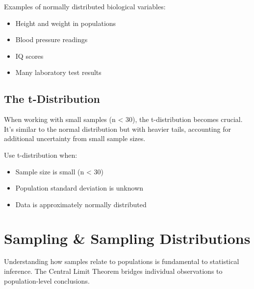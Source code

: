 \documentclass[
  11pt,
  letterpaper,
  oneside]{book}
\providecommand{\tightlist}{%
  \setlength{\itemsep}{0pt}\setlength{\parskip}{0pt}}\usepackage{longtable,booktabs,array}
\begin{document}
Examples of normally distributed biological variables:

\begin{itemize}
\tightlist
\item
  Height and weight in populations
\item
  Blood pressure readings
\item
  IQ scores
\item
  Many laboratory test results
\end{itemize}

\subsection{The t-Distribution}\label{the-t-distribution}

When working with small samples (n \textless{} 30), the t-distribution
becomes crucial. It's similar to the normal distribution but with
heavier tails, accounting for additional uncertainty from small sample
sizes.

\begin{tcolorbox}[enhanced jigsaw, left=2mm, opacityback=0, titlerule=0mm, leftrule=.75mm, colbacktitle=quarto-callout-warning-color!10!white, title=\textcolor{quarto-callout-warning-color}{\faExclamationTriangle}\hspace{0.5em}{When to Use t vs Normal}, breakable, opacitybacktitle=0.6, rightrule=.15mm, colframe=quarto-callout-warning-color-frame, toprule=.15mm, bottomrule=.15mm, bottomtitle=1mm, toptitle=1mm, coltitle=black, arc=.35mm, colback=white]

Use t-distribution when:

\begin{itemize}
\tightlist
\item
  Sample size is small (n \textless{} 30)
\item
  Population standard deviation is unknown
\item
  Data is approximately normally distributed
\end{itemize}

\end{tcolorbox}

\section{Sampling \& Sampling
Distributions}\label{sampling-sampling-distributions}

Understanding how samples relate to populations is fundamental to
statistical inference. The Central Limit Theorem bridges individual
observations to population-level conclusions.
\end{document}
